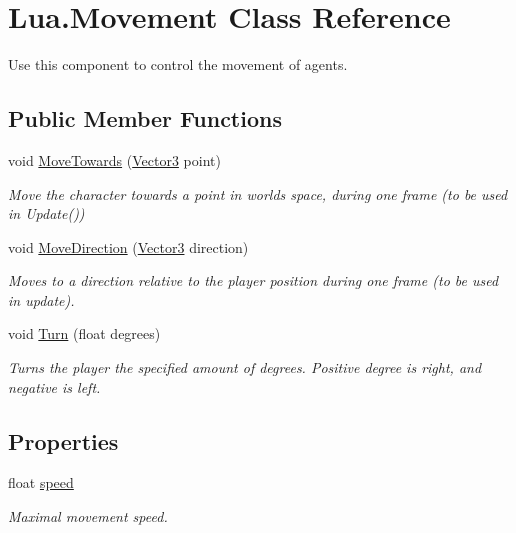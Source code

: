 \hypertarget{class_lua_1_1_movement}{}\section{Lua.\+Movement Class Reference}
\label{class_lua_1_1_movement}


Use this component to control the movement of agents.  


\subsection*{Public Member Functions}
\begin{DoxyCompactItemize}
\item 
void \mbox{\hyperlink{class_lua_1_1_movement_a6e9301bc7326c56f23fbb2eac2ad2f54}{Move\+Towards}} (\mbox{\hyperlink{class_lua_1_1_vector3}{Vector3}} point)
\begin{DoxyCompactList}\small\item\em Move the character towards a point in worlds space, during one frame (to be used in Update()) \end{DoxyCompactList}\item 
void \mbox{\hyperlink{class_lua_1_1_movement_ab1a73835885dca908bb6e5d23509ce40}{Move\+Direction}} (\mbox{\hyperlink{class_lua_1_1_vector3}{Vector3}} direction)
\begin{DoxyCompactList}\small\item\em Moves to a direction relative to the player position during one frame (to be used in update). \end{DoxyCompactList}\item 
void \mbox{\hyperlink{class_lua_1_1_movement_a26e7ee9591b48c6ddf74becf73ebe078}{Turn}} (float degrees)
\begin{DoxyCompactList}\small\item\em Turns the player the specified amount of degrees. Positive degree is right, and negative is left. \end{DoxyCompactList}\end{DoxyCompactItemize}
\subsection*{Properties}
\begin{DoxyCompactItemize}
\item 
float \mbox{\hyperlink{class_lua_1_1_movement_a72e61b8d3a308361d8bb6d80367af2df}{speed}}
\begin{DoxyCompactList}\small\item\em Maximal movement speed. \end{DoxyCompactList}\end{DoxyCompactItemize}


